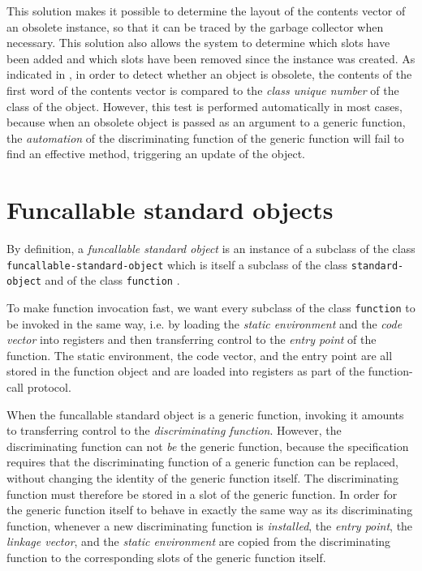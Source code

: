 This solution makes it possible to determine the layout of the
contents vector of an obsolete instance, so that it can be traced by
the garbage collector when necessary.  This solution also allows the
system to determine which slots have been added and which slots have
been removed since the instance was created.  As indicated in
, in order to
detect whether an object is obsolete, the contents of the first word
of the contents vector is compared to the \emph{class unique number}
of the class of the object.  However, this test is performed
automatically in most cases, because when an obsolete object is passed
as an argument to a generic function, the \emph{automation} of the
discriminating function of the generic function will fail to find an
effective method, triggering an update of the object. 

\section{Funcallable standard objects}
\label{sec-data-representation-funcallable-standard-objects}

By definition, a \emph{funcallable standard object} is an instance of
a subclass of the class \texttt{funcallable-standard-object} which is
itself a subclass of the class \texttt{standard-object}
 and of the class
\texttt{function} .

To make function invocation fast, we want every subclass of the class
\texttt{function} to be invoked in the same way, i.e. by loading the
\emph{static environment} and the \emph{code vector} into registers
and then transferring control to the \emph{entry point} of the
function. The static environment, the code vector, and the entry point
are all stored in the function object and are loaded into registers as
part of the function-call protocol.

When the funcallable standard object is a generic function, invoking
it amounts to transferring control to the \emph{discriminating
  function}.  However, the discriminating function can not \emph{be}
the generic function, because the \clos{} specification requires that
the discriminating function of a generic function can be replaced,
without changing the identity of the generic function itself.  The
discriminating function must therefore be stored in a slot of the
generic function.  In order for the generic function itself to behave
in exactly the same way as its discriminating function, whenever a new
discriminating function is \emph{installed}, the \emph{entry point},
the \emph{linkage vector}, and the \emph{static environment} are
copied from the discriminating function to the corresponding slots of
the generic function itself. 

